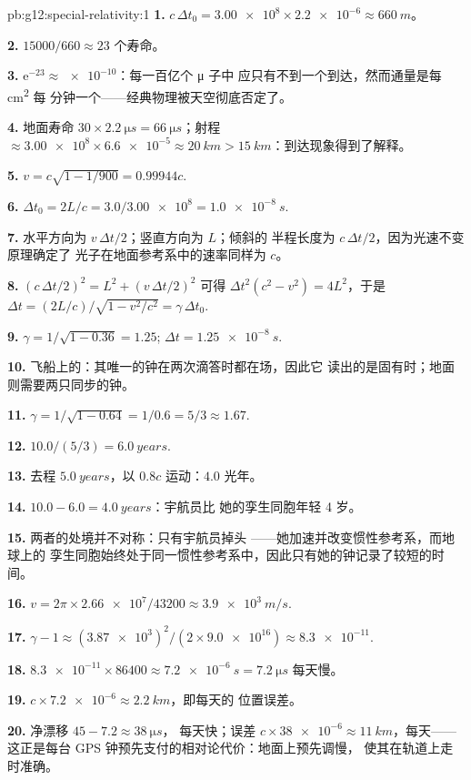 \begin{solution}{pb:g12:special-relativity:1}
\textbf{1.} $c\,\Delta t_0 = \num{3.00e8} \times \num{2.2e-6} \approx
\qty{660}{m}$。

\textbf{2.} $\num{15000}/660 \approx 23$ 个寿命。

\textbf{3.} $\mathrm{e}^{-23} \approx \num{e-10}$：每一百亿个 μ 子中
应只有不到一个到达，然而通量是每 \unit{cm^2} 每
分钟一个——经典物理被天空彻底否定了。

\textbf{4.} 地面寿命 $30 \times \qty{2.2}{\micro s} =
\qty{66}{\micro s}$；射程 $\approx \num{3.00e8} \times \num{6.6e-5}
\approx \qty{20}{km} > \qty{15}{km}$：到达现象得到了解释。

\textbf{5.} $v = c\sqrt{1 - 1/900} = 0.99944c$.

\textbf{6.} $\Delta t_0 = 2L/c = 3.0/\num{3.00e8} = \qty{1.0e-8}{s}$.

\textbf{7.} 水平方向为 $v\,\Delta t/2$；竖直方向为 $L$；倾斜的
半程长度为 $c\,\Delta t/2$，因为光速不变原理确定了
光子在地面参考系中的速率同样为 $c$。

\textbf{8.} $(c\,\Delta t/2)^2 = L^2 + (v\,\Delta t/2)^2$ 可得
$\Delta t^2(c^2 - v^2) = 4L^2$，于是 $\Delta t =
(2L/c)/\sqrt{1 - v^2/c^2} = \gamma\,\Delta t_0$.

\textbf{9.} $\gamma = 1/\sqrt{1 - 0.36} = 1.25$;
$\Delta t = \qty{1.25e-8}{s}$.

\textbf{10.} 飞船上的：其唯一的钟在两次滴答时都在场，因此它
读出的是固有时；地面则需要两只同步的钟。

\textbf{11.} $\gamma = 1/\sqrt{1 - 0.64} = 1/0.6 = 5/3 \approx 1.67$.

\textbf{12.} $10.0/(5/3) = \qty{6.0}{years}$.

\textbf{13.} 去程 $\qty{5.0}{years}$，以 $0.8c$ 运动：$4.0$ 光年。

\textbf{14.} $10.0 - 6.0 = \qty{4.0}{years}$：宇航员比
她的孪生同胞年轻 4 岁。

\textbf{15.} 两者的处境并不对称：只有宇航员掉头
——她加速并改变惯性参考系，而地球上的
孪生同胞始终处于同一惯性参考系中，因此只有她的钟记录了较短的时间。

\textbf{16.} $v = 2\pi \times \num{2.66e7}/\num{43200} \approx
\qty{3.9e3}{m/s}$.

\textbf{17.} $\gamma - 1 \approx (\num{3.87e3})^2/(2 \times
\num{9.0e16}) \approx \num{8.3e-11}$.

\textbf{18.} $\num{8.3e-11} \times \num{86400} \approx \qty{7.2e-6}{s}
= \qty{7.2}{\micro s}$ 每天慢。

\textbf{19.} $c \times \num{7.2e-6} \approx \qty{2.2}{km}$，即每天的
位置误差。

\textbf{20.} 净漂移 $45 - 7.2 \approx \qty{38}{\micro s}$，
每天快；误差 $c \times \num{38e-6} \approx \qty{11}{km}$，每天——
这正是每台 GPS 钟预先支付的相对论代价：地面上预先调慢，
使其在轨道上走时准确。
\end{solution}
